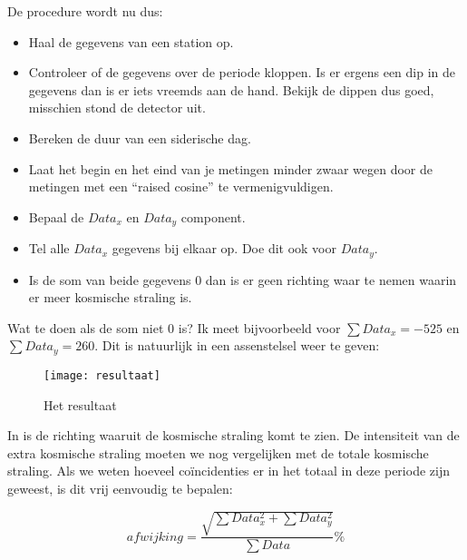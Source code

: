 De procedure wordt nu dus:
\begin{itemize}
\item Haal de gegevens van een station op.
\item Controleer of de gegevens over de periode kloppen. Is er ergens een
dip in de gegevens dan is er iets vreemds aan de hand. Bekijk de dippen
dus goed, misschien stond de detector uit.
\item Bereken de duur van een siderische dag.
\item Laat het begin en het eind van je metingen minder zwaar wegen door
de metingen met een ``raised cosine'' te vermenigvuldigen.
\item Bepaal de $Data_{x}$ en $Data_{y}$ component.
\item Tel alle $Data_{x}$ gegevens bij elkaar op. Doe dit ook voor $Data_{y}$.
\item Is de som van beide gegevens 0 dan is er geen richting waar te nemen
waarin er meer kosmische straling is.
\end{itemize}
Wat te doen als de som niet 0 is? Ik meet bijvoorbeeld voor $\sum Data_{x}=-525$
en $\sum Data_{y}=260$. Dit is natuurlijk in een assenstelsel weer
te geven:

\begin{figure}[h]
    \centering
    \texttt{[image: resultaat]}
    \caption{\label{fig:resultaat}Het resultaat}
\end{figure}


In  is de richting waaruit de kosmische straling komt te
zien. De intensiteit van de extra kosmische straling moeten we nog
vergelijken met de totale kosmische straling. Als we weten hoeveel
coïncidenties er in het totaal in deze periode zijn geweest, is dit
vrij eenvoudig te bepalen:

\begin{equation}
afwijking=\frac{\sqrt{\sum Data_{x}^{2}+\sum Data_{y}^{2}}}{\sum Data}\%
\end{equation}


